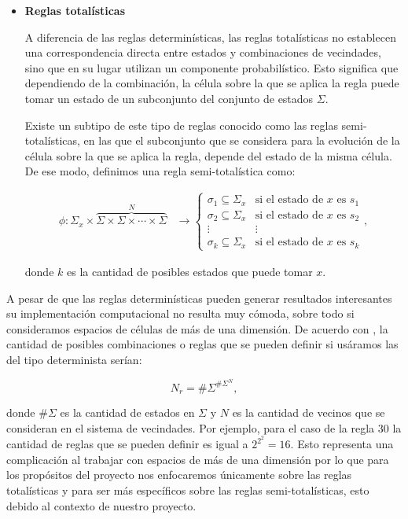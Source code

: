 \begin{itemize}
    \newpage
    
    \item \textbf{Reglas totalísticas}
    
    A diferencia de las reglas determinísticas, las reglas totalísticas no establecen una correspondencia directa entre estados y combinaciones de vecindades, sino que en su lugar utilizan un componente probabilístico. Esto significa que dependiendo de la combinación, la célula sobre la que se aplica la regla puede tomar un estado de un subconjunto del conjunto de estados $\Sigma$. 
    
    Existe un subtipo de este tipo de reglas conocido como las reglas semi-totalísticas, en las que el subconjunto que se considera para la evolución de la célula sobre la que se aplica la regla, depende del estado de la misma célula. De ese modo, definimos una regla semi-totalística como:
    
    \begin{align*}
        \phi:\Sigma_x\times\overbrace{\Sigma\times\Sigma\times\cdots\times\Sigma}^{N}&\longrightarrow \left\{ \begin{array}{cc}
        \sigma_1 \subseteq \Sigma_x & \text{si el estado de }x\text{ es }s_1 \\
        \sigma_2 \subseteq \Sigma_x & \text{si el estado de }x\text{ es }s_2 \\
        \vdots & \vdots \\
        \sigma_k \subseteq \Sigma_x & \text{si el estado de }x\text{ es }s_k
        \end{array} \right. ,
    \end{align*}
    
    donde $k$ es la cantidad de posibles estados que puede tomar $x$.
\end{itemize}

A pesar de que las reglas determinísticas pueden generar resultados interesantes su implementación computacional no resulta muy cómoda, sobre todo si consideramos espacios de células de más de una dimensión. De acuerdo con \cite{alfons2010}, la cantidad de posibles combinaciones o reglas que se pueden definir si usáramos las del tipo determinista serían:

$$N_r=\#\Sigma^{\#\Sigma^N},$$

donde $\#\Sigma$ es la cantidad de estados en $\Sigma$ y $N$ es la cantidad de vecinos que se consideran en el sistema de vecindades. Por ejemplo, para el caso de la regla 30 la cantidad de reglas que se pueden definir es igual a $2^{2^2}=16$. Esto representa una complicación al trabajar con espacios de más de una dimensión por lo que para los propósitos del proyecto nos enfocaremos únicamente sobre las reglas totalísticas y para ser más específicos sobre las reglas semi-totalísticas, esto debido al contexto de nuestro proyecto.

